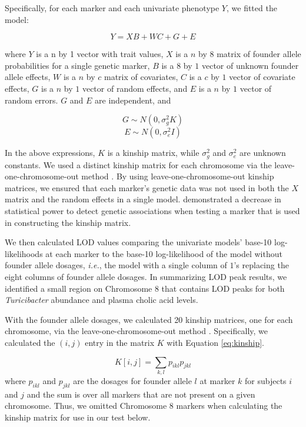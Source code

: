 \documentclass[oneside]{book}
\begin{document}
Specifically, for each marker and each univariate phenotype $Y$, we fitted the model:

\begin{equation}
Y = XB + WC + G + E  
\label{eq:uni-model}
\end{equation}

where $Y$ is a n by 1 vector with trait values, $X$ is a $n$ by $8$ matrix of founder allele probabilities for a single genetic marker, $B$ is a $8$ by $1$ vector of unknown founder allele effects, $W$ is a $n$ by $c$ matrix of covariates, $C$ is a $c$ by $1$ vector of covariate effects, $G$ is a $n$ by $1$ vector of random effects, and $E$ is a $n$ by $1$ vector of random errors. $G$ and $E$ are independent, and 

\begin{equation}
G \sim N(0, \sigma^2_g K)    
\end{equation}
\begin{equation}
E \sim N(0, \sigma^2_e I)    
\end{equation}


In the above expressions, $K$ is a kinship matrix, while $\sigma^2_g$ and $\sigma^2_e$ are unknown constants. We used a distinct kinship matrix for each chromosome via the leave-one-chromosome-out method \citep{yang2014advantages}. By using leave-one-chromosome-out kinship matrices, we ensured that each marker's genetic data was not used in both the $X$ matrix and the random effects in a single model. \citet{yang2014advantages} demonstrated a decrease in statistical power to detect genetic associations when testing a marker that is used in constructing the kinship matrix. 

We then calculated LOD values comparing the univariate models' base-10 log-likelihoods  at each marker to the base-10 log-likelihood of the model without founder allele dosages, \emph{i.e.}, the model with a single column of $1$'s replacing the eight columns of founder allele dosages. In summarizing LOD peak results, we identified a small region on Chromosome 8 that contains LOD peaks for both \emph{Turicibacter} abundance and plasma cholic acid levels.


With the founder allele dosages, we calculated 20 kinship matrices, one for each chromosome, via the leave-one-chromosome-out method \citep{yang2014advantages}. Specifically, we calculated the $(i, j)$ entry in the matrix $K$ with Equation \ref{eq:kinship}.

\begin{equation}
K[i, j] = \sum_{k,l}p_{ikl}p_{jkl}
\label{eq:kinship}
\end{equation}
where $p_{ikl}$ and $p_{jkl}$ are the dosages for founder allele $l$ at marker $k$ for subjects $i$ and $j$ and the sum is over all markers that are not present on a given chromosome. Thus, we omitted Chromosome 8 markers when calculating the kinship matrix for use in our test below. 
\end{document}
